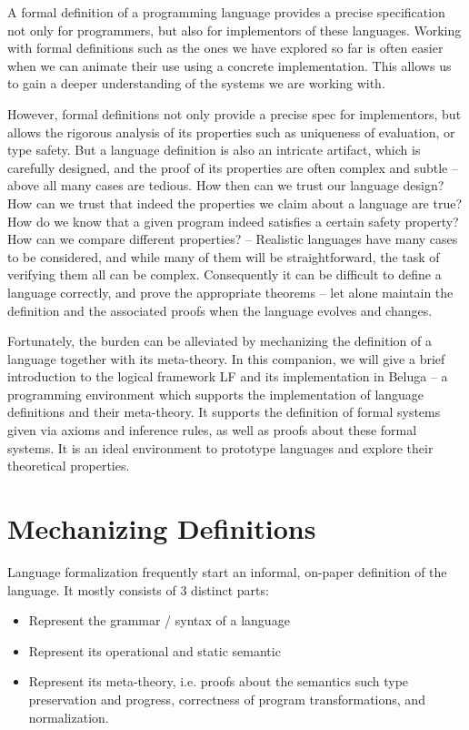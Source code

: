 A formal definition of a programming language
provides a precise specification not only for programmers, but also
for implementors of these languages. Working with formal definitions such as the
ones we have explored so far is often easier when we can animate their use using
a concrete implementation. This allows us to gain a deeper understanding of the
systems we are working with.

However, formal definitions not only provide a precise spec for implementors,
but allows the rigorous analysis of its properties such as uniqueness of
evaluation, or type safety. But a language definition is also an
intricate artifact, which is carefully designed, and the proof of its
properties are often complex and subtle --  above all many cases are
tedious. How then can we trust our language design? How can we trust
that indeed the properties we claim about a language are true? How do
we know that a given program indeed satisfies a certain safety
property? How can we compare different properties? --  
%
Realistic languages have many cases to be considered, and while many
of them will be straightforward, the task of verifying them all can
be complex. Consequently it can be difficult to define a language
correctly, and prove the appropriate theorems -- let alone maintain
the definition and the associated proofs when the language evolves and
changes.  

Fortunately, the burden can be alleviated by mechanizing the
definition of a language together with its meta-theory. In this companion,
we will give a brief introduction to the logical framework LF \citep{Harper93jacm} and its
implementation in Beluga \citep{Pientka:POPL08,Pientka:PPDP08,Pientka:IJCAR10,Cave:POPL12} -- a programming environment which
supports the implementation of language definitions and their
meta-theory. It supports the definition of formal systems given via
axioms and inference rules, as well as proofs about these formal
systems. It is an ideal environment to prototype languages and explore their
theoretical properties. %


\section{Mechanizing Definitions} Language formalization frequently
start an informal, on-paper definition of the language. It mostly
consists of 3 distinct parts: 

\begin{itemize}
\item Represent the grammar / syntax of a language
\item Represent its operational and static semantic
\item Represent its meta-theory, i.e. proofs about the semantics such
  type preservation and progress, correctness of program transformations, and normalization.
\end{itemize}

